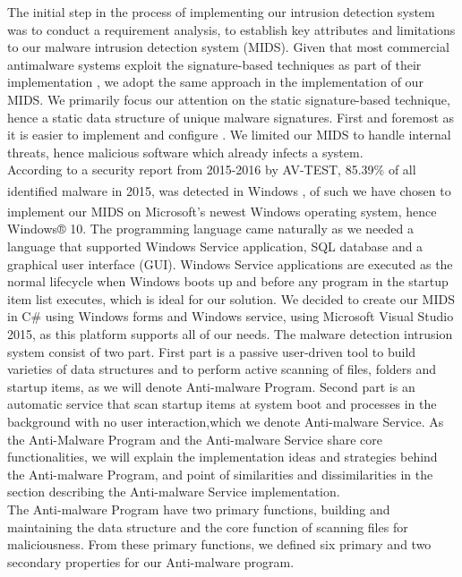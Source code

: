 \documentclass[12pt]{article} %
\begin{document}
The initial step in the process of implementing our intrusion detection system was to conduct a requirement analysis, to establish key attributes and limitations to our malware intrusion detection system (MIDS). Given that most commercial antimalware systems exploit the signature-based techniques as part of their implementation \cite{kruegel2003using}, we adopt the same approach in the implementation of our MIDS. We primarily focus our attention on the static signature-based technique, hence a static data structure of unique malware signatures. First and foremost as it is easier to implement and configure \cite{kruegel2003using}. We limited our MIDS to handle internal threats, hence malicious software which already infects a system.\\ 
According to a security report from 2015-2016 by AV-TEST, 85.39\% of all identified malware in 2015, was detected in Windows \textsuperscript{\textregistered} \cite{avtestreport}, of such we have chosen to implement our MIDS on Microsoft’s newest Windows\textsuperscript{\textregistered} operating system, hence Windows® 10. The programming language came naturally as we needed a language that supported Windows Service application, SQL database and a graphical user interface (GUI). Windows Service applications are executed as the normal lifecycle when Windows boots up and before any program in the startup item list executes, which is ideal for our solution. We decided to create our MIDS in C# using Windows forms and Windows service, using Microsoft Visual Studio 2015, as this platform supports all of our needs.
The malware detection intrusion system consist of two part. First part is a passive user-driven tool to build varieties of data structures and to perform active scanning of files, folders and startup items, as we will denote Anti-malware Program. Second part is an automatic service that scan startup items at system boot and processes in the background with no user interaction,which we denote Anti-malware Service. As the Anti-Malware Program and the Anti-malware Service share core functionalities, we will explain the implementation ideas and strategies behind the Anti-malware Program, and point of similarities and dissimilarities in the section describing the Anti-malware Service implementation.\\ 
The Anti-malware Program have two primary functions, building and maintaining the data structure and the core function of scanning files for maliciousness. From these primary functions, we defined six primary and two secondary properties for our Anti-malware program. 
\end{document}

